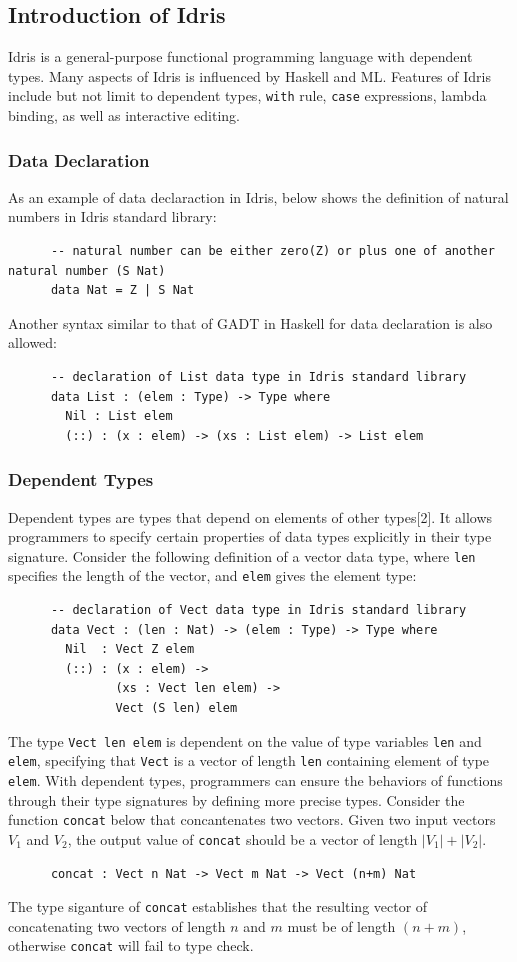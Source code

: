 \documentclass[11pt, a4paper]{article} %
\theoremstyle{definition}
\begin{document}
\subsection{Introduction of Idris}
Idris is a general-purpose functional programming language with dependent types. Many aspects of Idris is influenced by Haskell and ML. Features of Idris include but not limit to dependent types, \texttt{with} rule, \texttt{case} expressions, lambda binding, as well as interactive editing. 

\subsubsection*{Data Declaration}
As an example of data declaraction in Idris, below shows the definition of natural numbers in Idris standard library: 
\begin{lstlisting}
      -- natural number can be either zero(Z) or plus one of another natural number (S Nat)
      data Nat = Z | S Nat
\end{lstlisting}
Another syntax similar to that of GADT in Haskell for data declaration is also allowed: 
\begin{lstlisting}
      -- declaration of List data type in Idris standard library
      data List : (elem : Type) -> Type where
        Nil : List elem
        (::) : (x : elem) -> (xs : List elem) -> List elem
\end{lstlisting}

\subsubsection*{Dependent Types}
Dependent types are types that depend on elements of other types[2]. It allows programmers to specify certain properties of data types explicitly in their type signature. Consider the following definition of a vector data type, where \texttt{len} specifies the length of the vector, and \texttt{elem} gives the element type: 
\begin{lstlisting}
      -- declaration of Vect data type in Idris standard library
      data Vect : (len : Nat) -> (elem : Type) -> Type where
        Nil  : Vect Z elem
        (::) : (x : elem) -> 
               (xs : Vect len elem) -> 
               Vect (S len) elem
\end{lstlisting}
The type \texttt{Vect len elem} is dependent on the value of type variables \texttt{len} and \texttt{elem}, specifying that \texttt{Vect} is a vector of length \texttt{len} containing element of type \texttt{elem}. With dependent types, programmers can ensure the behaviors of functions through their type signatures by defining more precise types. Consider the function \texttt{concat} below that concantenates two vectors. Given two input vectors $V_1$ and $V_2$, the output value of \texttt{concat} should be a vector of length $|V_1| + |V_2|$.  
\begin{lstlisting}
      concat : Vect n Nat -> Vect m Nat -> Vect (n+m) Nat
\end{lstlisting}
The type siganture of \texttt{concat} establishes that the resulting vector of concatenating two vectors of length $n$ and $m$ must be of length $(n+m)$, otherwise \texttt{concat} will fail to type check. 
\end{document}
